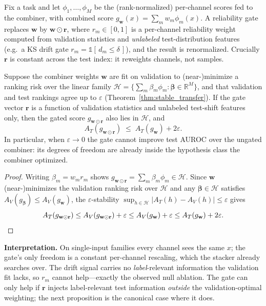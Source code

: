 Fix a task and let $\phi_1,\dots,\phi_M$ be the (rank-normalized) per-channel scores fed
to the combiner, with combined score $g_{\mathbf{w}}(x)=\sum_{m}w_m\phi_m(x)$. A
reliability gate replaces $\mathbf{w}$ by $\mathbf{w}\odot\mathbf{r}$, where
$r_m\in[0,1]$ is a per-channel reliability weight computed from validation statistics and
\emph{unlabeled} test-distribution features (e.g.\ a KS drift gate $r_m=\mathbb{1}[\,d_m\le\delta\,]$),
and the result is renormalized. Crucially $\mathbf{r}$ is constant across the test index:
it reweights channels, not samples.

\begin{proposition}
\label{prop:inert}
Suppose the combiner weights $\mathbf{w}$ are fit on validation to (near-)minimize a
ranking risk over the linear family $\mathcal{H}=\{\sum_m\beta_m\phi_m:\boldsymbol{\beta}\in\mathbb{R}^M\}$,
and that validation and test rankings agree up to $\varepsilon$ (Theorem~\ref{thm:stable_transfer}).
If the gate vector $\mathbf{r}$ is a function of validation statistics and unlabeled
test-shift features only, then the gated score $g_{\mathbf{w}\odot\mathbf{r}}$ also lies
in $\mathcal{H}$, and
\[
A_T\!\left(g_{\mathbf{w}\odot\mathbf{r}}\right)\;\le\;A_T\!\left(g_{\mathbf{w}}\right)+2\varepsilon .
\]
In particular, when $\varepsilon\to 0$ the gate cannot improve test AUROC over the
ungated combiner: its degrees of freedom are already inside the hypothesis class the
combiner optimized.
\end{proposition}
\begin{proof}
Writing $\beta_m=w_m r_m$ shows $g_{\mathbf{w}\odot\mathbf{r}}=\sum_m\beta_m\phi_m\in\mathcal{H}$.
Since $\mathbf{w}$ (near-)minimizes the validation ranking risk over $\mathcal{H}$ and any
$\boldsymbol{\beta}\in\mathcal{H}$ satisfies $A_V(g_{\boldsymbol{\beta}})\le A_V(g_{\mathbf{w}})$,
the $\varepsilon$-stability $\sup_{h\in\mathcal H}|A_T(h)-A_V(h)|\le\varepsilon$ gives
\[
A_T(g_{\mathbf{w}\odot\mathbf{r}})\le A_V(g_{\mathbf{w}\odot\mathbf{r}})+\varepsilon
\le A_V(g_{\mathbf{w}})+\varepsilon\le A_T(g_{\mathbf{w}})+2\varepsilon. \qedhere
\]
\end{proof}
\noindent\textbf{Interpretation.} On single-input families every channel sees the same
$x$; the gate's only freedom is a constant per-channel rescaling, which the stacker
already searches over. The drift signal carries no \emph{label}-relevant information the
validation fit lacks, so $r_m$ cannot help---exactly the observed null ablation. The gate
can only help if $\mathbf{r}$ injects label-relevant test information \emph{outside} the
validation-optimal weighting; the next proposition is the canonical case where it does.

